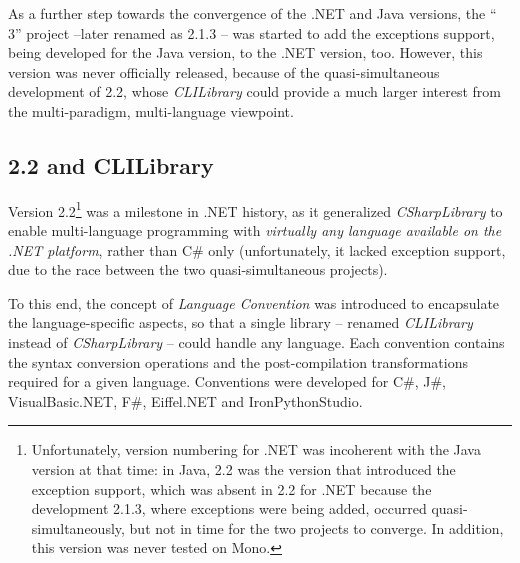 As a further step towards the convergence of the .NET and Java versions, the ``\tuprolog{} 3'' project --later renamed as 2.1.3 -- was started to add the exceptions support, being developed for the Java version, to the .NET version, too.
However, this version was never officially released, because of the quasi-simultaneous
development of \tuprolog{} 2.2, whose \textit{CLILibrary} could provide a much larger interest from the multi-paradigm, multi-language viewpoint.

\subsection{\tuprolog{} 2.2 and CLILibrary}
\label{ssec:dotnet-tuprolog2.2}

Version 2.2\footnote{%
    Unfortunately, version numbering for .NET was incoherent with the Java version at that time: in Java, 2.2 was the version that introduced the exception support, which was absent in 2.2 for .NET because the development \tuprolog{} 2.1.3, where exceptions were being added, occurred quasi-simultaneously, but not in time for the two projects to converge. In addition, this version was never tested on Mono.
} was a milestone in \tuprolog{}.NET history, as it generalized \textit{CSharpLibrary} to enable multi-language programming with \textit{virtually any language available on the .NET platform}, rather than C\# only (unfortunately, it lacked exception support, due to the race between the two quasi-simultaneous projects).

To this end, the concept of \textit{Language Convention} was introduced to encapsulate the language-specific aspects, so that a single library -- renamed \textit{CLILibrary} instead of \textit{CSharpLibrary} -- could handle any language.
%
Each convention contains the syntax conversion operations and the post-compilation transformations required for a given language.
Conventions were developed for C\#, J\#, VisualBasic.NET, F\#, Eiffel.NET and
IronPythonStudio.

